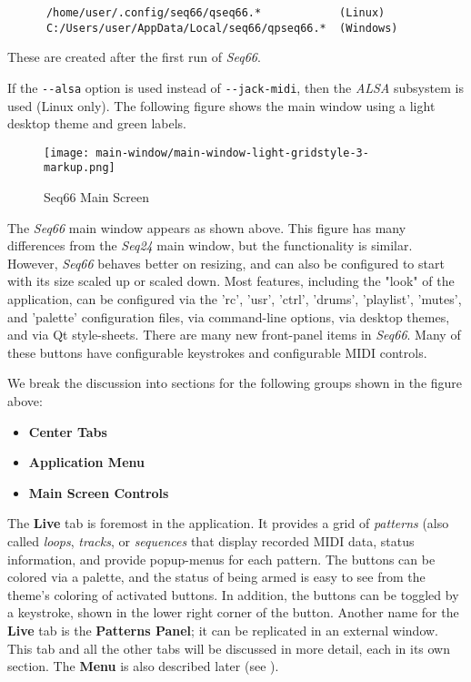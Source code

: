 \documentclass[
 11pt,
 twoside,
 a4paper,
 final                                 %
]{article}
\begin{document}
   \begin{verbatim}
      /home/user/.config/seq66/qseq66.*            (Linux)
      C:/Users/user/AppData/Local/seq66/qpseq66.*  (Windows)
   \end{verbatim}

   These are created after the first run of \textsl{Seq66}.

   If the \texttt{-{}-alsa} option is used instead of
   \texttt{-{}-jack-midi}, then the \textsl{ALSA} subsystem is used
   (Linux only).  The following figure shows the main window
   using a light desktop theme and green labels.

\begin{figure}[H]
   \centering 
   \texttt{[image: main-window/main-window-light-gridstyle-3-markup.png]}
   \caption{Seq66 Main Screen}
   \label{fig:main_screen}
\end{figure}

   The \textsl{Seq66} main window appears as shown above.
   This figure has many differences from the \textsl{Seq24} main window,
   but the functionality is similar.
   However, \textsl{Seq66} behaves better on resizing, and can also
   be configured to start with its size scaled up or scaled down.
   Most features, including the "look" of the application,
   can be configured via the 'rc', 'usr', 'ctrl', 'drums', 'playlist', 'mutes',
   and 'palette' configuration files, via command-line options, via
   desktop themes, and via Qt style-sheets.
   There are many new front-panel items in \textsl{Seq66}.
   Many of these buttons have configurable keystrokes and configurable MIDI
   controls.

   We break the discussion into sections for the following
   groups shown in the figure above:

   \begin{itemize}
      \item \textbf{Center Tabs}
      \item \textbf{Application Menu}
      \item \textbf{Main Screen Controls}
   \end{itemize}

   The \textbf{Live} tab is foremost in the application.
   It provides a grid of \textsl{patterns}
   (also called \textsl{loops}, \textsl{tracks}, or
   \textsl{sequences} that display recorded MIDI data, status information, and
   provide popup-menus for each pattern.
   The buttons can
   be colored via a palette, and the status of being armed is easy to see
   from the theme's coloring of activated buttons.
   In addition, the buttons can be toggled by a keystroke, shown in the lower
   right corner of the button.
   Another name for the \textbf{Live} tab is the \textbf{Patterns Panel};
   it can be replicated in an external window.
   This tab and all the other tabs
   will be discussed in more detail, each in its own section.
   The \textbf{Menu} is also described later (see ).
\end{document}
